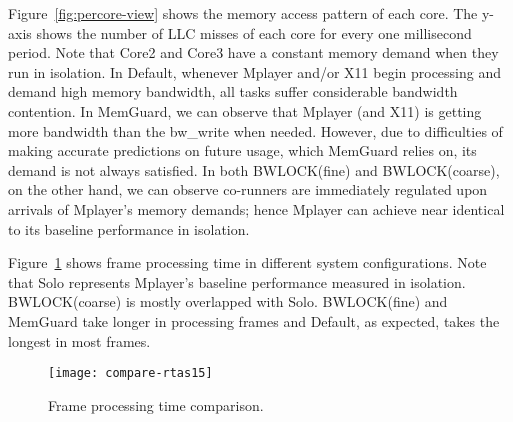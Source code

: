 \documentclass[times, 10pt,onecolumn]{article}
\begin{document}
Figure~\ref{fig:percore-view} shows the memory access pattern of each
core. The y-axis shows the number of LLC misses of each core for every one
millisecond period. Note that Core2 and Core3 have a constant memory
demand when they run in isolation. In Default, whenever Mplayer and/or
X11 begin processing and demand high memory bandwidth, all tasks
suffer considerable bandwidth contention. In MemGuard, we can observe
that Mplayer (and X11) is getting more bandwidth than the
bw\_write when needed. However, due to difficulties of making accurate
predictions on future usage, which MemGuard relies on, its demand is
not always satisfied. In both BWLOCK(fine) and BWLOCK(coarse), on the
other hand, we can observe co-runners are immediately regulated upon
arrivals of Mplayer's memory demands; hence Mplayer can achieve near
identical to its baseline performance in isolation.

Figure~\ref{fig:frameprocessing} shows frame processing time in
different system configurations. Note that Solo represents Mplayer's
baseline performance measured in isolation. BWLOCK(coarse) is mostly
overlapped with Solo. BWLOCK(fine) and MemGuard take longer in
processing frames and Default, as expected, takes the longest in most
frames.

\begin{figure}
\centering
\centering
\texttt{[image: compare-rtas15]}
\caption{Frame processing time comparison.}
\label{fig:frameprocessing}
\end{figure}
\end{document}
